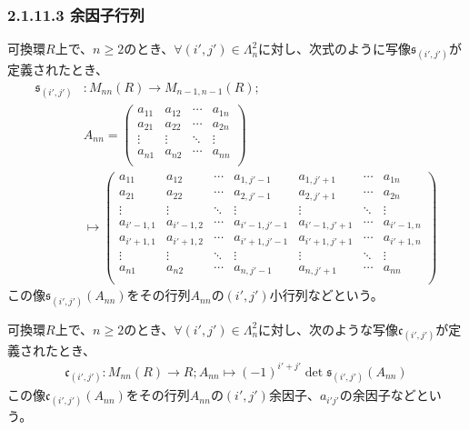 \documentclass[dvipdfmx]{jsarticle}
\begin{document}
\subsubsection{2.1.11.3 余因子行列}%
\begin{dfn}
可換環$R$上で、$n \geq 2$のとき、$\forall\left( i',j' \right) \in \varLambda_{n}^{2}$に対し、次式のように写像$\mathfrak{s}_{\left( i',j' \right)}$が定義されたとき、
\begin{align*}
\mathfrak{s}_{\left( i',j' \right)}&:M_{nn}(R) \rightarrow M_{n - 1,n - 1}(R);\\
&A_{nn} = \begin{pmatrix}
a_{11} & a_{12} & \cdots & a_{1n} \\
a_{21} & a_{22} & \cdots & a_{2n} \\
 \vdots & \vdots & \ddots & \vdots \\
a_{n1} & a_{n2} & \cdots & a_{nn} \\
\end{pmatrix} \\
&\mapsto \begin{pmatrix}
a_{11} & a_{12} & \cdots & a_{1,j' - 1} & a_{1,j' + 1} & \cdots & a_{1n} \\
a_{21} & a_{22} & \cdots & a_{2,j' - 1} & a_{2,j' + 1} & \cdots & a_{2n} \\
 \vdots & \vdots & \ddots & \vdots & \vdots & \ddots & \vdots \\
a_{i' - 1,1} & a_{i' - 1,2} & \cdots & a_{i' - 1,j' - 1} & a_{i' - 1,j' + 1} & \cdots & a_{i' - 1,n} \\
a_{i' + 1,1} & a_{i' + 1,2} & \cdots & a_{i' + 1,j' - 1} & a_{i' + 1,j' + 1} & \cdots & a_{i' + 1,n} \\
 \vdots & \vdots & \ddots & \vdots & \vdots & \ddots & \vdots \\
a_{n1} & a_{n2} & \cdots & a_{n,j' - 1} & a_{n,j' + 1} & \cdots & a_{nn} \\
\end{pmatrix}
\end{align*}
この像$\mathfrak{s}_{\left( i',j' \right)}\left( A_{nn} \right)$をその行列$A_{nn}$の$\left( i',j' \right)$小行列などという。
\end{dfn}
\begin{dfn}
可換環$R$上で、$n \geq 2$のとき、$\forall\left( i',j' \right) \in \varLambda_{n}^{2}$に対し、次のような写像$\mathfrak{c}_{\left( i',j' \right)}$が定義されたとき、
\begin{align*}
\mathfrak{c}_{\left( i',j' \right)}:M_{nn}(R) \rightarrow R;A_{nn} \mapsto ( - 1)^{i' + j'}\det{\mathfrak{s}_{\left( i',j' \right)}\left( A_{nn} \right)}
\end{align*}
この像$\mathfrak{c}_{\left( i',j' \right)}\left( A_{nn} \right)$をその行列$A_{nn}$の$\left( i',j' \right)$余因子、$a_{i'j'}$の余因子などという。
\end{dfn}
\end{document}
